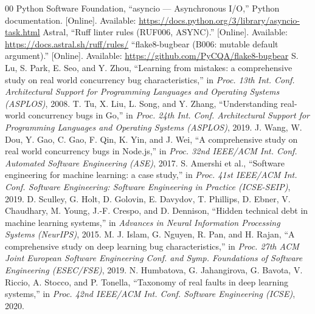 \documentclass[conference]{IEEEtran}
\begin{document}
\begin{thebibliography}{00}
 Python Software Foundation, ``asyncio --- Asynchronous I/O,'' Python documentation. [Online]. Available: \url{https://docs.python.org/3/library/asyncio-task.html}
 Astral, ``Ruff linter rules (RUF006, ASYNC).'' [Online]. Available: \url{https://docs.astral.sh/ruff/rules/}
 ``flake8-bugbear (B006: mutable default argument).'' [Online]. Available: \url{https://github.com/PyCQA/flake8-bugbear}
 S. Lu, S. Park, E. Seo, and Y. Zhou, ``Learning from mistakes: a comprehensive study on real world concurrency bug characteristics,'' in \emph{Proc. 13th Int. Conf. Architectural Support for Programming Languages and Operating Systems (ASPLOS)}, 2008.
 T. Tu, X. Liu, L. Song, and Y. Zhang, ``Understanding real-world concurrency bugs in Go,'' in \emph{Proc. 24th Int. Conf. Architectural Support for Programming Languages and Operating Systems (ASPLOS)}, 2019.
 J. Wang, W. Dou, Y. Gao, C. Gao, F. Qin, K. Yin, and J. Wei, ``A comprehensive study on real world concurrency bugs in Node.js,'' in \emph{Proc. 32nd IEEE/ACM Int. Conf. Automated Software Engineering (ASE)}, 2017.
 S. Amershi et al., ``Software engineering for machine learning: a case study,'' in \emph{Proc. 41st IEEE/ACM Int. Conf. Software Engineering: Software Engineering in Practice (ICSE-SEIP)}, 2019.
 D. Sculley, G. Holt, D. Golovin, E. Davydov, T. Phillips, D. Ebner, V. Chaudhary, M. Young, J.-F. Crespo, and D. Dennison, ``Hidden technical debt in machine learning systems,'' in \emph{Advances in Neural Information Processing Systems (NeurIPS)}, 2015.
 M. J. Islam, G. Nguyen, R. Pan, and H. Rajan, ``A comprehensive study on deep learning bug characteristics,'' in \emph{Proc. 27th ACM Joint European Software Engineering Conf. and Symp. Foundations of Software Engineering (ESEC/FSE)}, 2019.
 N. Humbatova, G. Jahangirova, G. Bavota, V. Riccio, A. Stocco, and P. Tonella, ``Taxonomy of real faults in deep learning systems,'' in \emph{Proc. 42nd IEEE/ACM Int. Conf. Software Engineering (ICSE)}, 2020.
\end{thebibliography}
\end{document}
